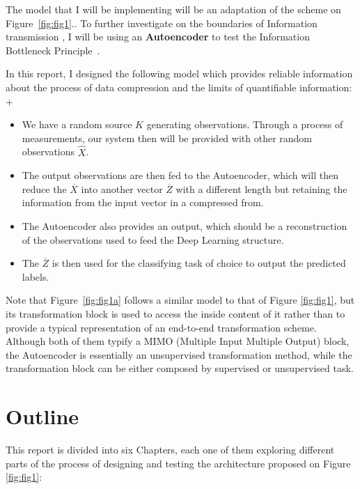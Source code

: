 The model that I will be implementing will be an adaptation of the scheme on Figure~\ref{fig:fig1}.. To further investigate on the boundaries of Information transmission , I will be using an \textbf{Autoencoder} to test the Information Bottleneck Principle~\cite{Inf_Bottleneck_first}.

In this report, I designed the following model which provides reliable information about the process of data compression and the limits of quantifiable information:
+
\begin{itemize}
	\item  We have a random source $K$ generating observations. Through a process of measurements, our system then will be provided with other random observations $\hat{X}$. 
	
	\item The output observations  are then fed to the Autoencoder, which will then reduce the $\overline X$ into another vector $\overline Z$ with a different length but retaining the information from the input vector in a compressed from. 
	
	\item The Autoencoder also provides  an output, which should be a reconstruction of the observations used to feed the Deep Learning structure. 
	
	\item The $\overline Z$ is then used for the classifying task of choice to output the predicted labels. 
	
\end{itemize}

Note that Figure~\ref{fig:fig1a} follows a similar model to that of Figure \ref{fig:fig1}, but its transformation block is used to access the inside content of it rather than to provide a typical representation of an end-to-end transformation scheme. Although both of them typify a MIMO (Multiple Input Multiple Output) block, the Autoencoder is essentially an unsupervised transformation method, while the transformation block can be either composed by supervised or unsupervised task.\par


\section{Outline}

This report is divided into six Chapters, each one of them exploring different parts of the process of designing and testing the architecture proposed on Figure \ref{fig:fig1}:

